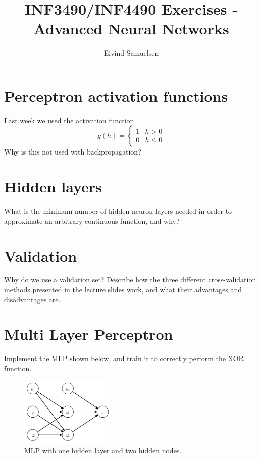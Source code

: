 
\title{\vspace{-2cm}INF3490/INF4490 Exercises - Advanced Neural Networks}
\author{Eivind Samuelsen}
\date{}

\setlength\parindent{0pt}


    \renewcommand\marginsymbol[1][0pt]{%
  \tabto*{0cm}\makebox[-1cm][c]{$\mathbb{P}$}\tabto*{\TabPrevPos}}

\maketitle


\section{Perceptron activation functions}
Last week we used the activation function
\[
g(h) =
\begin{cases}
      1 & h > 0 \\
      0 & h \leq 0
   \end{cases}
\]
Why is this not used with backpropagation?

\section{Hidden layers}
What is the minimum number of hidden neuron layers needed in order to approximate an arbitrary continuous function, and why?

\section{Validation}
Why do we use a validation set?
Describe how the three different cross-validation methods presented in the lecture slides work, and what their advantages and disadvantages are.

\section{Multi Layer Perceptron}
Implement the MLP shown below, and train it to correctly perform the XOR function.

\begin{figure}[H]
\begin{center}
\includegraphics[width=0.4\textwidth]{mlp.png}
\caption{MLP with one hidden layer and two hidden nodes.}
\label{fig:mlp}
\end{center}
\end{figure}

